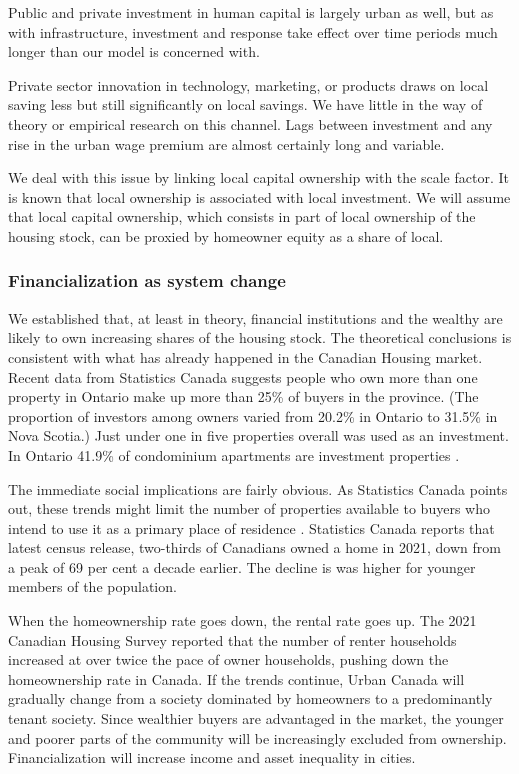 Public and private investment in human capital is largely urban as well, but as with infrastructure, investment and response take effect over time periods much longer than our model is concerned with. 

Private sector innovation in technology, marketing, or products draws on local saving less but still significantly on local savings. We have little in the way of theory or empirical research on this channel. Lags between investment and any rise in the urban wage premium are almost certainly long and variable. 

We deal with this issue by linking local capital ownership with the scale factor. It is known that local ownership is associated with local investment. We will assume that local capital ownership, which consists in part of local ownership of the housing stock, can be proxied by homeowner equity as a share of local. 

\subsubsection{Financialization as system change} \label{section-system}
We established that, at least in theory, financial institutions and the wealthy are likely to own increasing shares of the housing stock. The theoretical conclusions is consistent with what has already happened in the Canadian Housing market. Recent data from Statistics Canada \cite{fontaineResidentialRealEstate2023} suggests people who own more than one property in Ontario make up more than 25\% of buyers in the province. (The proportion of investors among owners varied from 20.2\% in Ontario to 31.5\% in Nova Scotia.)
Just under one in five properties overall was used as an investment.
In Ontario 41.9\% of condominium apartments are investment properties \cite{statisticscanadaBuyRentHousing2022}.

The immediate social implications are fairly obvious. As Statistics Canada points out, these trends might limit the number of properties available to buyers who intend to use it as a primary place of residence  \cite{fontaineResidentialRealEstate2023}. Statistics Canada reports that latest census release, two-thirds of Canadians owned a home in 2021, down from a peak of 69 per cent a decade earlier. The decline is was higher for younger members of the population. 

When the homeownership rate goes down, the rental rate goes up. The 2021 Canadian Housing Survey reported that the number of renter households increased  at over twice the pace of owner households, pushing down the homeownership rate in Canada. If the trends continue, Urban Canada will gradually change from a society dominated by homeowners to a predominantly tenant society. Since wealthier buyers are advantaged in the market, the younger and poorer parts of the community will be increasingly excluded from ownership. Financialization will increase income and asset inequality in cities.

